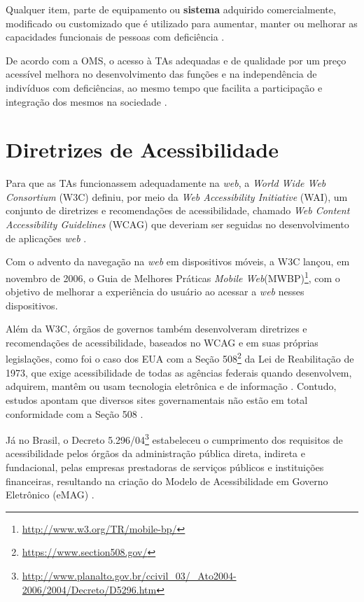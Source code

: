 \begin{citacao}
    Qualquer item, parte de equipamento ou \textbf{sistema} adquirido comercialmente, modificado ou customizado que é utilizado para aumentar, manter ou melhorar as capacidades
    funcionais de pessoas com deficiência \cite{Cook2014}.
\end{citacao}

De acordo com a OMS, o acesso à TAs adequadas e de qualidade por um preço acessível melhora
no desenvolvimento das funções e na independência de indivíduos com deficiências, ao mesmo tempo que facilita
a participação e integração dos mesmos na sociedade \cite{world2019global}.

\section{Diretrizes de Acessibilidade}

Para que as TAs funcionassem adequadamente na \emph{web}, a \textit{World Wide Web Consortium} (W3C) definiu, por meio da
\emph{Web Accessibility Initiative} (WAI), um conjunto de diretrizes e recomendações de acessibilidade, chamado
\emph{Web Content Accessibility Guidelines} (WCAG) que deveriam ser seguidas no desenvolvimento de aplicações \emph{web}
\cite{W3C2019}.

Com o advento da navegação na \emph{web} em dispositivos móveis, a W3C lançou, em novembro
de 2006, o Guia de Melhores Práticas \emph{Mobile Web}(MWBP)\footnote{\url{http://www.w3.org/TR/mobile-bp/}}, com o objetivo de
melhorar a experiência do usuário ao acessar a \emph{web} nesses dispositivos.

Além da W3C, órgãos de governos também desenvolveram diretrizes e recomendações de acessibilidade, baseados no WCAG e
em suas próprias legislações, como foi o caso dos EUA com a Seção 508\footnote{\url{https://www.section508.gov/}}
da Lei de Reabilitação de 1973, que exige acessibilidade de todas as agências federais quando desenvolvem,
adquirem, mantêm ou usam tecnologia eletrônica e de informação \cite{JAEGER2006169}. Contudo, estudos apontam que diversos
sites governamentais não estão em total conformidade com a Seção 508 \cite{KING2016715,YI201575}.

Já no Brasil, o Decreto 5.296/04\footnote{\url{http://www.planalto.gov.br/ccivil_03/_Ato2004-2006/2004/Decreto/D5296.htm}}
estabeleceu o cumprimento dos requisitos de acessibilidade pelos órgãos da administração pública direta, indireta e fundacional,
pelas empresas prestadoras de serviços públicos e instituições financeiras, resultando na criação do Modelo de Acessibilidade
em Governo Eletrônico (eMAG) \cite{EMAG_2007}.

